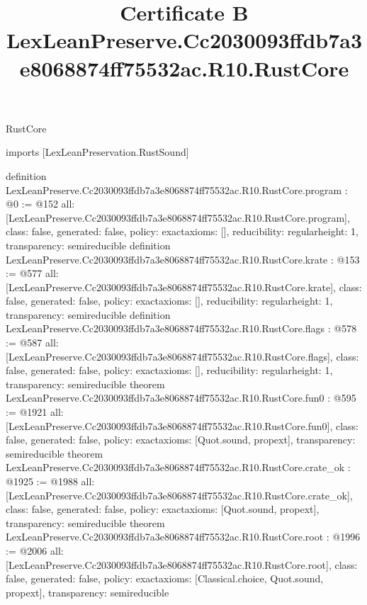\begin{lexlean}{RustCore}
\title{Certificate B LexLeanPreserve.Cc2030093ffdb7a3e8068874ff75532ac.R10.RustCore}
\begin{coremodule}
imports [LexLeanPreservation.RustSound]

definition LexLeanPreserve.Cc2030093ffdb7a3e8068874ff75532ac.R10.RustCore.program : @0 := @152 {
  all: [LexLeanPreserve.Cc2030093ffdb7a3e8068874ff75532ac.R10.RustCore.program],
  class: false,
  generated: false,
  policy: exact{axioms: []},
  reducibility: regular{height: 1},
  transparency: semireducible
}
definition LexLeanPreserve.Cc2030093ffdb7a3e8068874ff75532ac.R10.RustCore.krate : @153 := @577 {
  all: [LexLeanPreserve.Cc2030093ffdb7a3e8068874ff75532ac.R10.RustCore.krate],
  class: false,
  generated: false,
  policy: exact{axioms: []},
  reducibility: regular{height: 1},
  transparency: semireducible
}
definition LexLeanPreserve.Cc2030093ffdb7a3e8068874ff75532ac.R10.RustCore.flags : @578 := @587 {
  all: [LexLeanPreserve.Cc2030093ffdb7a3e8068874ff75532ac.R10.RustCore.flags],
  class: false,
  generated: false,
  policy: exact{axioms: []},
  reducibility: regular{height: 1},
  transparency: semireducible
}
theorem LexLeanPreserve.Cc2030093ffdb7a3e8068874ff75532ac.R10.RustCore.fun0 : @595 := @1921 {
  all: [LexLeanPreserve.Cc2030093ffdb7a3e8068874ff75532ac.R10.RustCore.fun0],
  class: false,
  generated: false,
  policy: exact{axioms: [Quot.sound, propext]},
  transparency: semireducible
}
theorem LexLeanPreserve.Cc2030093ffdb7a3e8068874ff75532ac.R10.RustCore.crate_ok : @1925 := @1988 {
  all: [LexLeanPreserve.Cc2030093ffdb7a3e8068874ff75532ac.R10.RustCore.crate_ok],
  class: false,
  generated: false,
  policy: exact{axioms: [Quot.sound, propext]},
  transparency: semireducible
}
theorem LexLeanPreserve.Cc2030093ffdb7a3e8068874ff75532ac.R10.RustCore.root : @1996 := @2006 {
  all: [LexLeanPreserve.Cc2030093ffdb7a3e8068874ff75532ac.R10.RustCore.root],
  class: false,
  generated: false,
  policy: exact{axioms: [Classical.choice, Quot.sound, propext]},
  transparency: semireducible
}


\end{coremodule}
\end{lexlean}
